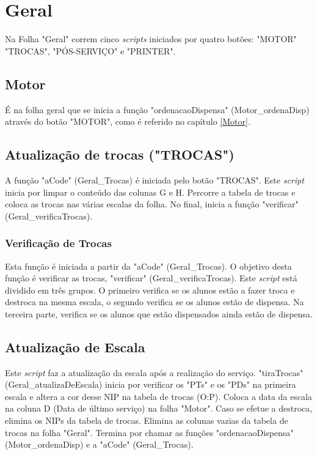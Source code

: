 \graphicspath{{Images/}}

\section{Geral}
Na Folha "Geral" correm cinco \textit{scripts} iniciados por quatro botões: "MOTOR" "TROCAS", "PÓS-SERVIÇO" e "PRINTER".

\subsection{Motor}

É na folha geral que se inicia a função "ordenacaoDispensa" (Motor\_ordenaDisp) através do botão "MOTOR", como é referido no capítulo \ref{Motor}.

\subsection{Atualização de trocas ("TROCAS")}
\label{Atualização de trocas}
A função "aCode" (Geral\_Trocas) é iniciada pelo botão "TROCAS". Este \textit{script} inicia por limpar o conteúdo das colunas G e H. Percorre a tabela de trocas e coloca as trocas nas várias escalas da folha. No final, inicia a função "verificar" (Geral\_verificaTrocas).

\subsubsection{Verificação de Trocas}
Esta função é iniciada a partir da "aCode" (Geral\_Trocas). O objetivo desta função é verificar as trocas,
"verificar" (Geral\_verificaTrocas). Este \textit{script} está dividido em três grupos. O primeiro verifica se os alunos estão a fazer troca e destroca na mesma escala, o segundo verifica se os alunos estão de dispensa. Na terceira parte, verifica se os alunos que estão dispensados ainda estão de dispensa.

\subsection{Atualização de Escala}
Este \textit{script} faz a atualização da escala após a realização do serviço. "tiraTrocas" (Geral\_atualizaDeEscala) inicia por verificar os "PTs" e os "PDs" na primeira escala e altera a cor desse NIP na tabela de trocas (O:P). Coloca a data da escala na coluna D (Data de último serviço) na folha "Motor". Caso se efetue a destroca, elimina os NIPs da tabela de trocas. Elimina as colunas vazias da tabela de trocas na folha "Geral". Termina por chamar as funções "ordenacaoDispensa" (Motor\_ordenaDisp) e a "aCode" (Geral\_Trocas).

